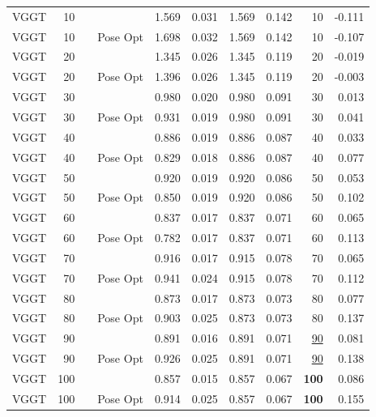 \begin{table}[H]
\begin{tabular}{lrllrrrrrr}
VGGT & 10 &  &  & 1.569 & 0.031 & 1.569 & 0.142 & 10 & -0.111 \\
VGGT & 10 &  & Pose Opt & 1.698 & 0.032 & 1.569 & 0.142 & 10 & -0.107 \\
VGGT & 20 &  &  & 1.345 & 0.026 & 1.345 & 0.119 & 20 & -0.019 \\
VGGT & 20 &  & Pose Opt & 1.396 & 0.026 & 1.345 & 0.119 & 20 & -0.003 \\
VGGT & 30 &  &  & 0.980 & 0.020 & 0.980 & 0.091 & 30 & 0.013 \\
VGGT & 30 &  & Pose Opt & 0.931 & 0.019 & 0.980 & 0.091 & 30 & 0.041 \\
VGGT & 40 &  &  & 0.886 & 0.019 & 0.886 & 0.087 & 40 & 0.033 \\
VGGT & 40 &  & Pose Opt & 0.829 & 0.018 & 0.886 & 0.087 & 40 & 0.077 \\
VGGT & 50 &  &  & 0.920 & 0.019 & 0.920 & 0.086 & 50 & 0.053 \\
VGGT & 50 &  & Pose Opt & 0.850 & 0.019 & 0.920 & 0.086 & 50 & 0.102 \\
VGGT & 60 &  &  & 0.837 & 0.017 & 0.837 & 0.071 & 60 & 0.065 \\
VGGT & 60 &  & Pose Opt & 0.782 & 0.017 & 0.837 & 0.071 & 60 & 0.113 \\
VGGT & 70 &  &  & 0.916 & 0.017 & 0.915 & 0.078 & 70 & 0.065 \\
VGGT & 70 &  & Pose Opt & 0.941 & 0.024 & 0.915 & 0.078 & 70 & 0.112 \\
VGGT & 80 &  &  & 0.873 & 0.017 & 0.873 & 0.073 & 80 & 0.077 \\
VGGT & 80 &  & Pose Opt & 0.903 & 0.025 & 0.873 & 0.073 & 80 & 0.137 \\
VGGT & 90 &  &  & 0.891 & 0.016 & 0.891 & 0.071 & \underline{90} & 0.081 \\
VGGT & 90 &  & Pose Opt & 0.926 & 0.025 & 0.891 & 0.071 & \underline{90} & 0.138 \\
VGGT & 100 &  &  & 0.857 & 0.015 & 0.857 & 0.067 & \textbf{100} & 0.086 \\
VGGT & 100 &  & Pose Opt & 0.914 & 0.025 & 0.857 & 0.067 & \textbf{100} & 0.155 \\
\bottomrule
\end{tabular}
\end{table}
